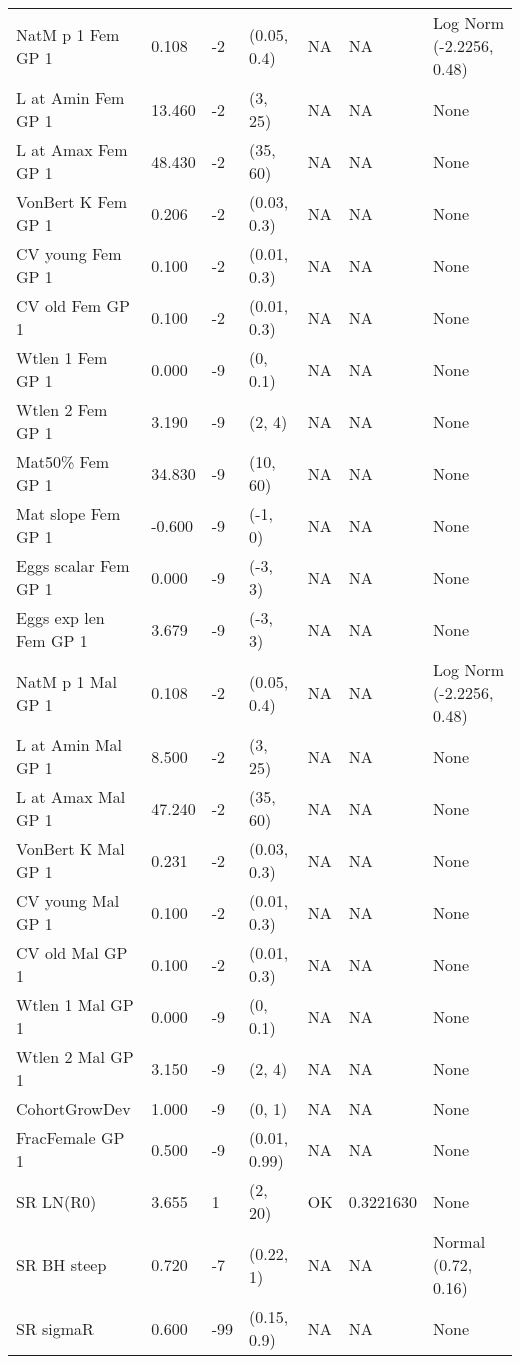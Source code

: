 \documentclass[11pt,
  english,
  a4paper,
]{article}
\begin{document}
\begin{landscape}
\begin{longtable}[t]{>{\raggedright\arraybackslash}p{6cm}lllll>{\raggedright\arraybackslash}p{4cm}}
\endfoot
\bottomrule
\endlastfoot
NatM p 1 Fem GP 1 & 0.108 & -2 & (0.05, 0.4) & NA & NA & Log Norm (-2.2256, 0.48)\\
L at Amin Fem GP 1 & 13.460 & -2 & (3, 25) & NA & NA & None\\
L at Amax Fem GP 1 & 48.430 & -2 & (35, 60) & NA & NA & None\\
VonBert K Fem GP 1 & 0.206 & -2 & (0.03, 0.3) & NA & NA & None\\
CV young Fem GP 1 & 0.100 & -2 & (0.01, 0.3) & NA & NA & None\\
CV old Fem GP 1 & 0.100 & -2 & (0.01, 0.3) & NA & NA & None\\
Wtlen 1 Fem GP 1 & 0.000 & -9 & (0, 0.1) & NA & NA & None\\
Wtlen 2 Fem GP 1 & 3.190 & -9 & (2, 4) & NA & NA & None\\
Mat50\% Fem GP 1 & 34.830 & -9 & (10, 60) & NA & NA & None\\
Mat slope Fem GP 1 & -0.600 & -9 & (-1, 0) & NA & NA & None\\
Eggs scalar Fem GP 1 & 0.000 & -9 & (-3, 3) & NA & NA & None\\
Eggs exp len Fem GP 1 & 3.679 & -9 & (-3, 3) & NA & NA & None\\
NatM p 1 Mal GP 1 & 0.108 & -2 & (0.05, 0.4) & NA & NA & Log Norm (-2.2256, 0.48)\\
L at Amin Mal GP 1 & 8.500 & -2 & (3, 25) & NA & NA & None\\
L at Amax Mal GP 1 & 47.240 & -2 & (35, 60) & NA & NA & None\\
VonBert K Mal GP 1 & 0.231 & -2 & (0.03, 0.3) & NA & NA & None\\
CV young Mal GP 1 & 0.100 & -2 & (0.01, 0.3) & NA & NA & None\\
CV old Mal GP 1 & 0.100 & -2 & (0.01, 0.3) & NA & NA & None\\
Wtlen 1 Mal GP 1 & 0.000 & -9 & (0, 0.1) & NA & NA & None\\
Wtlen 2 Mal GP 1 & 3.150 & -9 & (2, 4) & NA & NA & None\\
CohortGrowDev & 1.000 & -9 & (0, 1) & NA & NA & None\\
FracFemale GP 1 & 0.500 & -9 & (0.01, 0.99) & NA & NA & None\\
SR LN(R0) & 3.655 & 1 & (2, 20) & OK & 0.3221630 & None\\
SR BH steep & 0.720 & -7 & (0.22, 1) & NA & NA & Normal (0.72, 0.16)\\
SR sigmaR & 0.600 & -99 & (0.15, 0.9) & NA & NA & None\\

\end{longtable}
\end{landscape}
\end{document}
